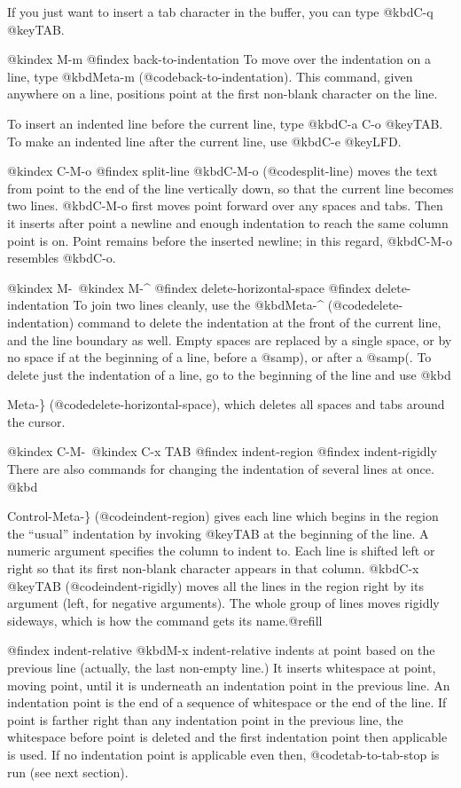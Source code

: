 {{{{{{{{{{{{{{{{{{  If you just want to insert a tab character in the buffer, you can type
@kbd{C-q @key{TAB}}.

@kindex M-m
@findex back-to-indentation
  To move over the indentation on a line, type @kbd{Meta-m}
(@code{back-to-indentation}).  This command, given anywhere on a line,
positions point at the first non-blank character on the line.

  To insert an indented line before the current line, type @kbd{C-a C-o
@key{TAB}}.  To make an indented line after the current line, use
@kbd{C-e @key{LFD}}.

@kindex C-M-o
@findex split-line
  @kbd{C-M-o} (@code{split-line}) moves the text from point to the end of
the line vertically down, so that the current line becomes two lines.
@kbd{C-M-o} first moves point forward over any spaces and tabs.  Then it
inserts after point a newline and enough indentation to reach the same
column point is on.  Point remains before the inserted newline; in this
regard, @kbd{C-M-o} resembles @kbd{C-o}.

@kindex M-\
@kindex M-^
@findex delete-horizontal-space
@findex delete-indentation
  To join two lines cleanly, use the @kbd{Meta-^}
(@code{delete-indentation}) command to delete the indentation at the
front of the current line, and the line boundary as well.  Empty spaces
are replaced by a single space, or by no space if at the beginning of a
line, before a @samp{)}, or after a @samp{(}.  To delete just the
indentation of a line, go to the beginning of the line and use
@kbd{Meta-\} (@code{delete-horizontal-space}), which deletes all spaces
and tabs around the cursor.

@kindex C-M-\
@kindex C-x TAB
@findex indent-region
@findex indent-rigidly
  There are also commands for changing the indentation of several lines at
once.  @kbd{Control-Meta-\} (@code{indent-region}) gives each line which
begins in the region the ``usual'' indentation by invoking @key{TAB} at the
beginning of the line.  A numeric argument specifies the column to indent
to.  Each line is shifted left or right so that its first non-blank
character appears in that column.  @kbd{C-x @key{TAB}}
(@code{indent-rigidly}) moves all the lines in the region right by its
argument (left, for negative arguments).  The whole group of lines moves
rigidly sideways, which is how the command gets its name.@refill

@findex indent-relative
  @kbd{M-x indent-relative} indents at point based on the previous line
(actually, the last non-empty line.)  It inserts whitespace at point, moving
point, until it is underneath an indentation point in the previous line.
An indentation point is the end of a sequence of whitespace or the end of
the line.  If point is farther right than any indentation point in the
previous line, the whitespace before point is deleted and the first
indentation point then applicable is used.  If no indentation point is
applicable even then, @code{tab-to-tab-stop} is run (see next section).

}}}}}}}}}}}}}}}}}}}}
